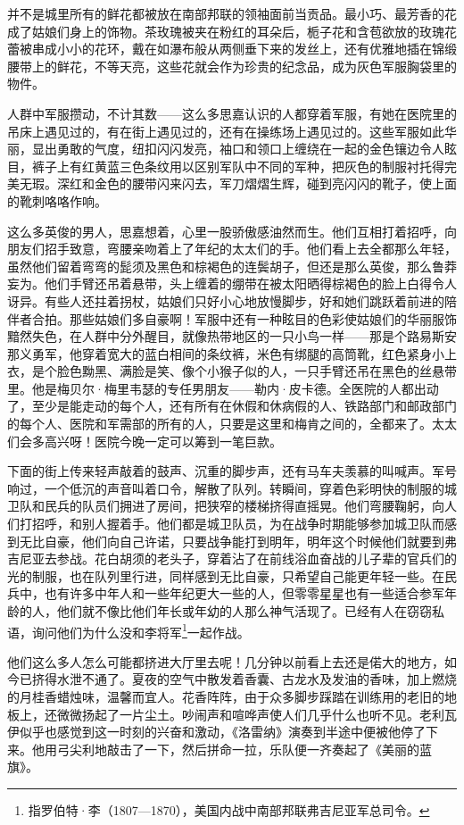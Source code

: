 \par 并不是城里所有的鲜花都被放在南部邦联的领袖面前当贡品。最小巧、最芳香的花成了姑娘们身上的饰物。茶玫瑰被夹在粉红的耳朵后，栀子花和含苞欲放的玫瑰花蕾被串成小小的花环，戴在如瀑布般从两侧垂下来的发丝上，还有优雅地插在锦缎腰带上的鲜花，不等天亮，这些花就会作为珍贵的纪念品，成为灰色军服胸袋里的物件。
\par 人群中军服攒动，不计其数——这么多思嘉认识的人都穿着军服，有她在医院里的吊床上遇见过的，有在街上遇见过的，还有在操练场上遇见过的。这些军服如此华丽，显出勇敢的气度，纽扣闪闪发亮，袖口和领口上缠绕在一起的金色镶边令人眩目，裤子上有红黄蓝三色条纹用以区别军队中不同的军种，把灰色的制服衬托得完美无瑕。深红和金色的腰带闪来闪去，军刀熠熠生辉，碰到亮闪闪的靴子，使上面的靴刺咯咯作响。
\par 这么多英俊的男人，思嘉想着，心里一股骄傲感油然而生。他们互相打着招呼，向朋友们招手致意，弯腰亲吻着上了年纪的太太们的手。他们看上去全都那么年轻，虽然他们留着弯弯的髭须及黑色和棕褐色的连鬓胡子，但还是那么英俊，那么鲁莽妄为。他们手臂还吊着悬带，头上缠着的绷带在被太阳晒得棕褐色的脸上白得令人讶异。有些人还拄着拐杖，姑娘们只好小心地放慢脚步，好和她们跳跃着前进的陪伴者合拍。那些姑娘们多自豪啊！军服中还有一种眩目的色彩使姑娘们的华丽服饰黯然失色，在人群中分外醒目，就像热带地区的一只小鸟一样——那是个路易斯安那义勇军，他穿着宽大的蓝白相间的条纹裤，米色有绑腿的高筒靴，红色紧身小上衣，是个脸色黝黑、满脸是笑、像个小猴子似的人，一只手臂还吊在黑色的丝悬带里。他是梅贝尔·梅里韦瑟的专任男朋友——勒内·皮卡德。全医院的人都出动了，至少是能走动的每个人，还有所有在休假和休病假的人、铁路部门和邮政部门的每个人、医院和军需部的所有的人，只要是这里和梅肯之间的，全都来了。太太们会多高兴呀！医院今晚一定可以筹到一笔巨款。
\par 下面的街上传来轻声敲着的鼓声、沉重的脚步声，还有马车夫羡慕的叫喊声。军号响过，一个低沉的声音叫着口令，解散了队列。转瞬间，穿着色彩明快的制服的城卫队和民兵的队员们拥进了房间，把狭窄的楼梯挤得直摇晃。他们弯腰鞠躬，向人们打招呼，和别人握着手。他们都是城卫队员，为在战争时期能够参加城卫队而感到无比自豪，他们向自己许诺，只要战争能打到明年，明年这个时候他们就要到弗吉尼亚去参战。花白胡须的老头子，穿着沾了在前线浴血奋战的儿子辈的官兵们的光的制服，也在队列里行进，同样感到无比自豪，只希望自己能更年轻一些。在民兵中，也有许多中年人和一些年纪更大一些的人，但零零星星也有一些适合参军年龄的人，他们就不像比他们年长或年幼的人那么神气活现了。已经有人在窃窃私语，询问他们为什么没和李将军\footnote{指罗伯特·李（1807—1870），美国内战中南部邦联弗吉尼亚军总司令。}一起作战。
\par 他们这么多人怎么可能都挤进大厅里去呢！几分钟以前看上去还是偌大的地方，如今已挤得水泄不通了。夏夜的空气中散发着香囊、古龙水及发油的香味，加上燃烧的月桂香蜡烛味，温馨而宜人。花香阵阵，由于众多脚步踩踏在训练用的老旧的地板上，还微微扬起了一片尘土。吵闹声和喧哗声使人们几乎什么也听不见。老利瓦伊似乎也感觉到这一时刻的兴奋和激动，《洛雷纳》演奏到半途中便被他停了下来。他用弓尖利地敲击了一下，然后拼命一拉，乐队便一齐奏起了《美丽的蓝旗》。
